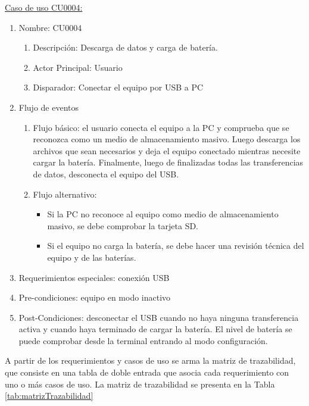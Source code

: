 	\underline{Caso de uso CU0004:}

	\begin{enumerate} 
		\item Nombre: CU0004
		\begin{enumerate} [label*=\arabic*.]
			\item Descripción: Descarga de datos y carga de batería.
			\item Actor Principal: Usuario
			\item Disparador: Conectar el equipo por USB a PC
		\end{enumerate}
		\item Flujo de eventos
		\begin{enumerate} [label*=\arabic*.]
			\item Flujo básico: el usuario conecta el equipo a la PC y comprueba que se reconozca como un medio de almacenamiento masivo. Luego descarga los archivos que sean necesarios y deja el equipo conectado mientras necesite cargar la batería. Finalmente, luego de finalizadas todas las transferencias de datos, desconecta el equipo del USB.
			\item Flujo alternativo:
			\begin{itemize}
				\item Si la PC no reconoce al equipo como medio de almacenamiento masivo, se debe comprobar la tarjeta SD.
				\item Si el equipo no carga la batería, se debe hacer una revisión técnica del equipo y de las baterías.			
			\end{itemize}				
		\end{enumerate}

		\item Requerimientos especiales: conexión USB
		\item Pre-condiciones: equipo en modo inactivo
		\item Post-Condiciones: desconectar el USB cuando no haya ninguna transferencia activa y cuando haya terminado de cargar la batería. El nivel de batería se puede comprobar desde la terminal entrando al modo configuración.
	\end{enumerate}
	
A partir de los requerimientos y casos de uso se arma la matriz de trazabilidad, que consiste en una tabla de doble entrada que asocia cada requerimiento con uno o más casos de uso. La matriz de trazabilidad se presenta en la Tabla \ref{tab:matrizTrazabilidad}

\footnotesize

